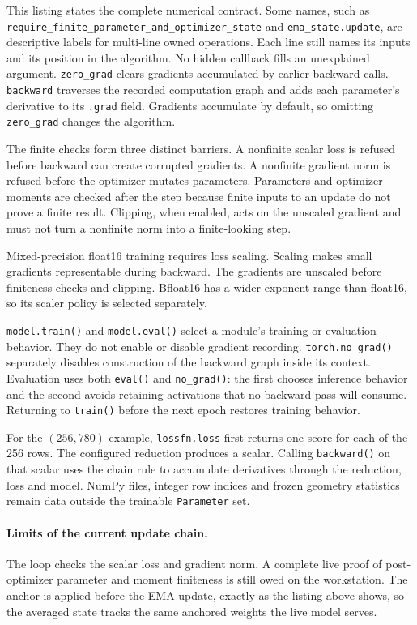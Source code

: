 \documentclass[10pt,aps,prd,twocolumn,nofootinbib]{revtex4-2}
\newcommand{\code}[1]{\texttt{#1}}
\begin{document}
This listing states the complete numerical contract.  Some names, such as
\code{require\_finite\_parameter\_and\_optimizer\_state} and
\code{ema\_state.update}, are descriptive labels for multi-line owned
operations.  Each line still names its inputs and its
position in the algorithm.  No hidden callback fills an unexplained argument.
\code{zero\_grad} clears gradients accumulated by earlier backward calls.
\code{backward} traverses the recorded computation graph and adds each
parameter's derivative to its \code{.grad} field.  Gradients accumulate by
default, so omitting \code{zero\_grad} changes the algorithm.

The finite checks form three distinct barriers.  A nonfinite scalar loss is
refused before backward can create corrupted gradients.  A nonfinite gradient
norm is refused before the optimizer mutates parameters.  Parameters and
optimizer moments are checked after the step because finite inputs to an
update do not prove a finite result.  Clipping, when enabled, acts on the
unscaled gradient and must not turn a nonfinite norm into a finite-looking
step.

Mixed-precision float16 training requires loss scaling.  Scaling makes small
gradients representable during backward.  The gradients are unscaled before
finiteness checks and clipping.  Bfloat16 has a wider exponent range than
float16, so its scaler policy is selected separately.

\code{model.train()} and \code{model.eval()} select a module's training or
evaluation behavior.  They do not enable or disable gradient recording.
\code{torch.no\_grad()} separately disables construction of the backward
graph inside its context.  Evaluation uses both \code{eval()} and
\code{no\_grad()}: the first chooses inference behavior and the second avoids
retaining activations that no backward pass will consume.  Returning to
\code{train()} before the next epoch restores training behavior.

For the $(256,780)$ example, \code{lossfn.loss} first returns one score for
each of the 256 rows.  The configured reduction produces a scalar.  Calling
\code{backward()} on that scalar uses the chain rule to accumulate derivatives
through the reduction, loss and model.  NumPy files, integer row indices and
frozen geometry statistics remain data outside the trainable
\code{Parameter} set.

\paragraph{Limits of the current update chain.}
The loop checks the scalar loss and gradient norm.  A complete live proof of
post-optimizer parameter and moment finiteness is still owed on the
workstation.  The anchor is applied before the EMA update, exactly as the
listing above shows, so the averaged state tracks the same anchored weights
the live model serves.
\end{document}
